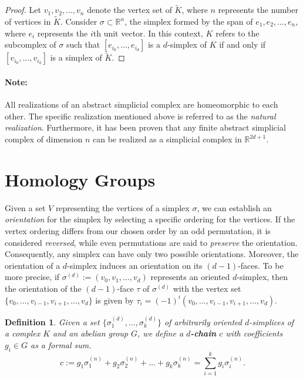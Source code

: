 \documentclass{article}
\newtheorem*{definition}{Definition}
\begin{document}
\begin{proof}
Let ${v_1,v_2, \ldots, v_n}$ denote the vertex set of $\tilde{K}$, where $n$ represents the number of vertices in $\tilde{K}$. Consider $\sigma \subset \mathbb{R}^n$, the simplex formed by the span of ${e_1, e_2, \ldots, e_n}$, where $e_i$ represents the $i$th unit vector. In this context, $K$ refers to the subcomplex of $\sigma$ such that $[e_{i_0}, \ldots, e_{i_d}]$ is a $d$-simplex of $K$ if and only if $[v_{i_0}, \ldots, v_{i_k}]$ is a simplex of $\tilde{K}$.
\end{proof}

\paragraph{Note:}
All realizations of an abstract simplicial complex are homeomorphic to each other. The specific realization mentioned above is referred to as the \emph{natural realization}. Furthermore, it has been proven that any finite abstract simplicial complex of dimension $n$ can be realized as a simplicial complex in $\mathbb{R}^{2d+1}$.

\section{Homology Groups}
Given a set $V$ representing the vertices of a simplex $\sigma$, we can establish an \emph{orientation} for the simplex by selecting a specific ordering for the vertices. If the vertex ordering differs from our chosen order by an odd permutation, it is considered \emph{reversed}, while even permutations are said to \emph{preserve} the orientation. Consequently, any simplex can have only two possible orientations. Moreover, the orientation of a $d$-simplex induces an orientation on its $(d-1)$-faces. To be more precise, if $\sigma^{(d)} := (v_0, v_1, \ldots, v_d)$ represents an oriented $d$-simplex, then the orientation of the $(d-1)$-face $\tau$ of $\sigma^{(d)}$ with the vertex set $\{v_0,\ldots,v_{i-1},v_{i+1},\ldots,v_d\}$ is given by $\tau_i = (-1)^i (v_0, \ldots,v_{i-1},v_{i+1},\ldots,v_d)$.

\begin{definition}
Given a set $\{\sigma_1^{(d)}, \ldots, \sigma_k^{(d)}\}$ of arbitrarily oriented $d$-simplices of a complex $K$ and an abelian group $G$, we define a \textbf{$d$-chain} $c$ with coefficients $g_i \in G$ as a formal sum.
\begin{equation}
c := g_1 \sigma^{(n)}_1 + g_2 \sigma^{(n)}_2 + \ldots + g_k \sigma^{(n)}_k = \sum_{i=1}^{k} g_i \sigma^{(n)}_i.
\end{equation}
\end{definition}
\end{document}
